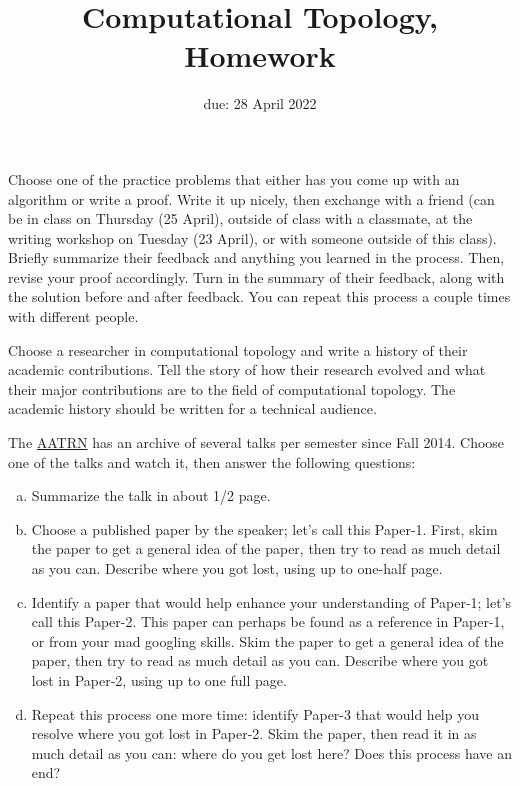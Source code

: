 \documentclass{article}
\title{Computational Topology, Homework \hwnum}
\author{\todo{your name here}}
\date{due: 28 April 2022}
\begin{document}
\maketitle



Choose one of the practice problems that either has you come up with an
algorithm or write a proof.  Write it up nicely, then exchange with a friend
(can be in class on Thursday (25 April), outside of class with a classmate, at
the writing workshop on Tuesday (23 April), or with someone outside of this
class). Briefly summarize their feedback and anything you learned in the
process.  Then, revise your proof accordingly.  Turn in the summary of their
feedback, along with the solution before and after feedback. You can repeat this
process a couple times with different people.


Choose a researcher in computational topology and write a history of their
academic contributions.  Tell the story of how their research evolved and what
their major contributions are to the field of computational topology.  The
academic history should be written for a technical audience.

The \href{https://topology.ima.umn.edu/seminars}{AATRN} has an archive of
several talks per semester since Fall 2014.  Choose one of the talks and
watch it, then answer the following questions:
\begin{enumerate}[(a)]
    \item Summarize the talk in about 1/2 page.
    \item Choose a published paper by the speaker; let's
        call this Paper-1.  First,
        skim the paper to get a general idea of the paper, then try to
        read as much detail as you can.  Describe where you got lost,
        using up to one-half page.
    \item Identify a paper that would help enhance your understanding of
        Paper-1; let's call this Paper-2.  This paper can perhaps be
        found as a reference in Paper-1, or from your mad googling
        skills. Skim the paper to get a general idea of the paper, then try to
        read as much detail as you can.  Describe where you got lost in
        Paper-2,
        using up to one full page.
    \item Repeat this process one more time: identify Paper-3 that would
        help you resolve where you got lost in Paper-2. Skim the paper,
        then read it in as much detail as you can: where do you get lost
        here?  Does this process have an end?
\end{enumerate}
\end{document}
